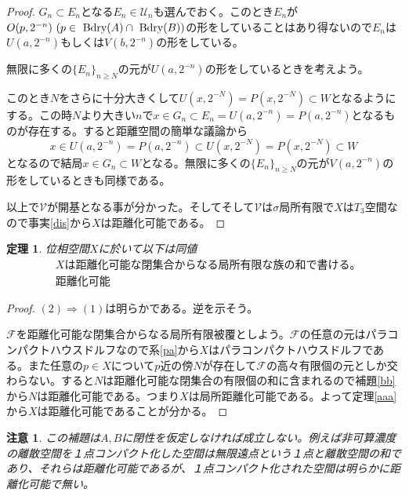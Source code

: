 \documentclass[leqno]{jsarticle}
\newtheorem{thm}{定理}
\newtheorem*{cau}{注意}
\newcommand{\To}{\Longrightarrow}
\newcommand{\bd}{\text{  {\rm Bdry}} }
\newcommand{\uu}{\mathcal{U}}
\newcommand{\vv}{\mathcal{V}}
\begin{document}
\begin{proof}
$G_n\subset E_n$となる$E_n\in \uu_n$も選んでおく。このとき$E_n$が$O(p,2^{-n})\ (p\in \bd(A)\cap \bd(B))$の形をしていることはあり得ないので$E_n$は$U(a,2^{-n})$もしくは$V(b,2^{-n})$の形をしている。\par
無限に多くの$\{E_n\}_{n\ge N}$の元が$U(a,2^{-n})$の形をしているときを考えよう。\par
このとき$N$をさらに十分大きくして$U(x,2^{-N})=P(x,2^{-N})\subset W$となるようにする。この時$N$より大きい$n$で$x\in G_n\subset E_n=U(a,2^{-n})=P(a,2^{-n})$となるものが存在する。すると距離空間の簡単な議論から
\[
x\in U(a,2^{-n})=P(a,2^{-n})\subset U(x,2^{-N})=P(x,2^{-N})\subset W
\]
となるので結局$x\in G_n\subset W$となる。無限に多くの$\{E_n\}_{n\ge N}$の元が$V(a,2^{-n})$の形をしているときも同様である。
\par
以上で$\vv$が開基となる事が分かった。そしてそして$\vv$は$\sigma$局所有限で$X$は$T_3$空間なので事実\ref{dis}から$X$は距離化可能である。
\end{proof}



\setcounter{equation}{0}
\begin{thm}
位相空間$X$に於いて以下は同値
\begin{align}
&\mbox{$X$は距離化可能な閉集合からなる局所有限な族の和で書ける。}\\
&\mbox{距離化可能}
\end{align}
\end{thm}
\begin{proof}
$(2)\To(1)$は明らかである。逆を示そう。\par
$\mathcal{F}$を距離化可能な閉集合からなる局所有限被覆としよう。$\mathcal{F}$の任意の元はパラコンパクトハウスドルフなので系\ref{pa}から$X$はパラコンパクトハウスドルフである。また任意の$p\in X$について$p$近の傍$N$が存在して$\mathcal{F}$の高々有限個の元としか交わらない。すると$N$は距離化可能な閉集合の有限個の和に含まれるので補題\ref{bb}から$N$は距離化可能である。つまり$X$は局所距離化可能である。よって定理\ref{aaa}から$X$は距離化可能であることが分かる。
\end{proof}
\begin{cau}
この補題は$A,B$に閉性を仮定しなければ成立しない。例えば非可算濃度の離散空間を１点コンパクト化した空間は無限遠点という１点と離散空間の和であり、それらは距離化可能であるが、１点コンパクト化された空間は明らかに距離化可能で無い。
\end{cau}
\end{document}
